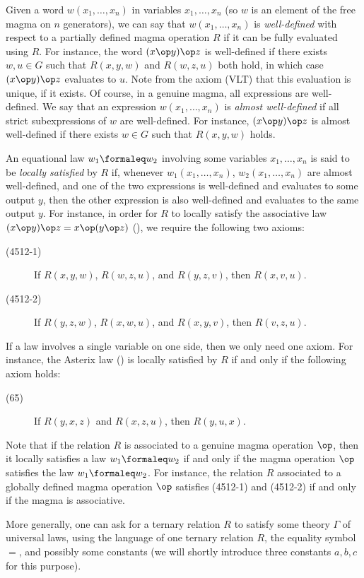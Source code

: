 Given a word $w(x_1,\dots,x_n)$ in variables $x_1,\dots,x_n$ (so $w$ is an element of the free magma on $n$ generators), we can say that $w(x_1,\dots,x_n)$ is \emph{well-defined} with respect to a partially defined magma operation $R$ if it can be fully evaluated using $R$.  For instance, the word $(x \op y) \op z$ is well-defined if there exists $w,u \in G$ such that $R(x,y,w)$ and $R(w,z,u)$ both hold, in which case $(x \op y) \op z$ evaluates to $u$.  Note from the axiom (VLT) that this evaluation is unique, if it exists.  Of course, in a genuine magma, all expressions are well-defined.  We say that an expression $w(x_1,\dots,x_n)$ is \emph{almost well-defined} if all strict subexpressions of $w$ are well-defined.  For instance, $(x \op y) \op z$ is almost well-defined if there exists $w \in G$ such that $R(x,y,w)$ holds.

An equational law $w_1 \formaleq w_2$ involving some variables $x_1,\dots,x_n$ is said to be \emph{locally satisfied} by $R$ if,  whenever $w_1(x_1,\dots,x_n)$, $w_2(x_1,\dots,x_n)$ are almost well-defined, and one of the two expressions is well-defined and evaluates to some output $y$, then the other expression is also well-defined and evaluates to the same output $y$.  For instance, in order for $R$ to locally satisfy the associative law $(x \op y) \op z = x \op (y \op z)$ (), we require the following two axioms:
\begin{description}
  \item[(4512-1)] If $R(x,y,w)$, $R(w,z,u)$, and $R(y,z,v)$, then $R(x,v,u)$.
  \item[(4512-2)] If $R(y,z,w)$, $R(x,w,u)$, and $R(x,y,v)$, then $R(v,z,u)$.
\end{description}
If a law involves a single variable on one side, then we only need one axiom.  For instance, the Asterix law () is locally satisfied by $R$ if and only if the following axiom holds:
\begin{description}
  \item[(65)] If $R(y,x,z)$ and $R(x,z,u)$, then $R(y,u,x)$.
\end{description}
Note that if the relation $R$ is associated to a genuine magma operation $\op$, then it locally satisfies a law $w_1 \formaleq w_2$ if and only if the magma operation $\op$ satisfies the law $w_1 \formaleq w_2$.  For instance, the relation $R$ associated to a globally defined magma operation $\op$ satisfies (4512-1) and (4512-2) if and only if the magma is associative.

More generally, one can ask for a ternary relation $R$ to satisfy some theory $\Gamma$ of universal laws, using the language of one ternary relation $R$, the equality symbol $=$, and possibly some constants (we will shortly introduce three constants $a,b,c$ for this purpose).

